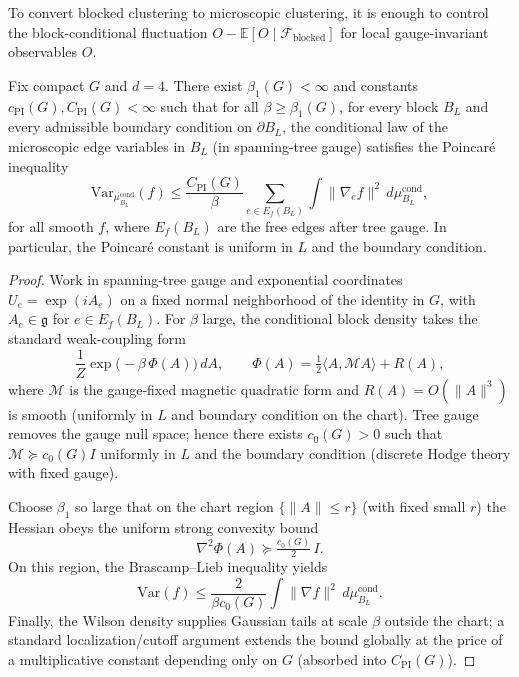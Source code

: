 To convert blocked clustering to microscopic clustering, it is enough to control the block-conditional
fluctuation $O-\mathbb E[O\mid\mathcal F_{\mathrm{blocked}}]$ for local gauge-invariant observables $O$.

\begin{lemma}\label{lem:block_cond_poincare_proved}
Fix compact $G$ and $d=4$. There exist $\beta_1(G)<\infty$ and constants $c_{\mathrm{PI}}(G),C_{\mathrm{PI}}(G)<\infty$
such that for all $\beta\ge\beta_1(G)$, for every block $B_L$ and every admissible boundary condition on $\partial B_L$,
the conditional law of the microscopic edge variables in $B_L$ (in spanning-tree gauge) satisfies the Poincar\'e inequality
\[
\mathrm{Var}_{\mu_{B_L}^{\mathrm{cond}}}(f)\le \frac{C_{\mathrm{PI}}(G)}{\beta}
\sum_{e\in E_f(B_L)}\int \|\nabla_e f\|^2\,d\mu_{B_L}^{\mathrm{cond}},
\]
for all smooth $f$, where $E_f(B_L)$ are the free edges after tree gauge. In particular, the Poincar\'e constant is uniform
in $L$ and the boundary condition.
\end{lemma}

\begin{proof}
Work in spanning-tree gauge and exponential coordinates $U_e=\exp(iA_e)$ on a fixed normal neighborhood of the identity in $G$,
with $A_e\in\mathfrak g$ for $e\in E_f(B_L)$. For $\beta$ large, the conditional block density takes the standard weak-coupling form
\[
\frac{1}{Z}\exp\!\big(-\beta\,\Phi(A)\big)\,dA,\qquad
\Phi(A)=\tfrac12\langle A,\mathcal M A\rangle + R(A),
\]
where $\mathcal M$ is the gauge-fixed magnetic quadratic form and $R(A)=O(\|A\|^3)$ is smooth (uniformly in $L$ and boundary condition
on the chart). Tree gauge removes the gauge null space; hence there exists $c_0(G)>0$ such that $\mathcal M\succeq c_0(G) I$
uniformly in $L$ and the boundary condition (discrete Hodge theory with fixed gauge).

Choose $\beta_1$ so large that on the chart region $\{\|A\|\le r\}$ (with fixed small $r$) the Hessian obeys the uniform strong convexity bound
\[
\nabla^2\Phi(A)\succeq \tfrac{c_0(G)}{2}\,I.
\]
On this region, the Brascamp--Lieb inequality yields
\[
\mathrm{Var}(f)\le \frac{2}{\beta c_0(G)}\int \|\nabla f\|^2\,d\mu_{B_L}^{\mathrm{cond}}.
\]
Finally, the Wilson density supplies Gaussian tails at scale $\beta$ outside the chart; a standard localization/cutoff argument
extends the bound globally at the price of a multiplicative constant depending only on $G$ (absorbed into $C_{\mathrm{PI}}(G)$).
\end{proof}


